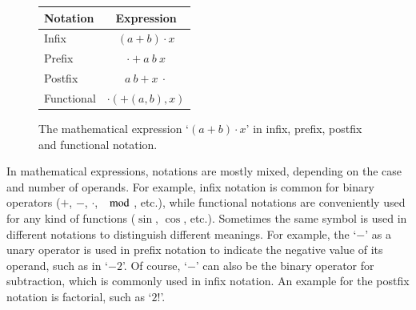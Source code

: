 \documentclass[a4paper,11pt]{article}
\theoremstyle{defTheoStyle}
\theoremstyle{defExampStyle}
\begin{document}
\begin{figure} %
\vspace{-8pt}
\begin{minipage}{0.38\textwidth}
\center
\begin{tabular}{lc}
	\hline
	Notation & Expression \\
	\hline
	Infix & $(a+b) \cdot x$\\
	Prefix & $\cdot + a\ b\ x$\\
	Postfix & $a\ b + x\ \cdot$\\
	Functional & $\cdot(+(a, b), x)$\\
	\hline
\end{tabular}
\caption{The mathematical expression `$(a+b) \cdot x$' in infix, prefix, postfix and functional notation.}
\label{tab:notations}
\end{minipage}
\end{figure}

In mathematical expressions, notations are mostly mixed, depending on the case and number of operands. For example, infix notation is common for binary operators ($+$, $-$, $\cdot$, $\mod$, etc.), while functional notations are conveniently used for any kind of functions ($\sin$, $\cos$, etc.). Sometimes the same symbol is used in different notations to distinguish different meanings. For example, the `$-$' as a unary operator is used in prefix notation to indicate the negative value of its operand, such as in `$-2$'. Of course, `$-$' can also be the binary operator for subtraction, which is commonly used in infix notation. An example for the postfix notation is factorial, such as `$2!$'.
\end{document}
